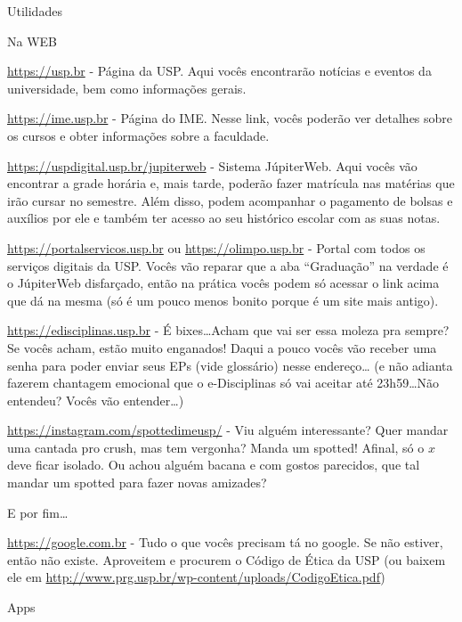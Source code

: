\begin{secao}{Utilidades}

\begin{subsecao}{Na WEB}

\url{https://usp.br} - Página da USP. Aqui vocês encontrarão notícias e eventos da
universidade, bem como informações gerais.

\url{https://ime.usp.br} - Página do IME. Nesse link, vocês poderão ver detalhes sobre
os cursos e obter informações sobre a faculdade.

\url{https://uspdigital.usp.br/jupiterweb} - Sistema JúpiterWeb. Aqui vocês vão
encontrar a grade horária e, mais tarde, poderão fazer matrícula nas matérias
que irão cursar no semestre. Além disso, podem acompanhar o pagamento de
bolsas e auxílios por ele e também ter acesso ao seu histórico escolar com
as suas notas.

\url{https://portalservicos.usp.br} ou \url{https://olimpo.usp.br} - Portal com todos os
serviços digitais da USP. Vocês vão reparar que a aba ``Graduação'' na verdade
é o JúpiterWeb disfarçado, então na prática vocês podem só acessar o link acima
que dá na mesma (só é um pouco menos bonito porque é um site mais antigo).

\url{https://edisciplinas.usp.br} - É bixes\dots Acham que vai ser essa moleza pra
sempre? Se vocês acham, estão muito enganados! Daqui a pouco vocês vão receber
uma senha para poder enviar seus EPs (vide glossário) nesse endereço\dots
(e não adianta fazerem chantagem emocional que o e-Disciplinas só vai aceitar
até 23h59\dots Não entendeu? Vocês vão entender\dots)

\url{https://instagram.com/spottedimeusp/} - Viu alguém interessante? Quer mandar uma
cantada pro crush, mas tem vergonha? Manda um spotted! Afinal, só o $x$ deve
ficar isolado. Ou achou alguém bacana e com gostos parecidos, que tal mandar um
spotted para fazer novas amizades?


E por fim\dots

\url{https://google.com.br} - Tudo o que vocês precisam tá no google. Se não
estiver, então não existe. Aproveitem e procurem o Código de Ética da USP (ou
baixem ele em \url{http://www.prg.usp.br/wp-content/uploads/CodigoEtica.pdf})

\end{subsecao}

\begin{subsecao}{Apps}
	

\end{subsecao}
\end{secao}
